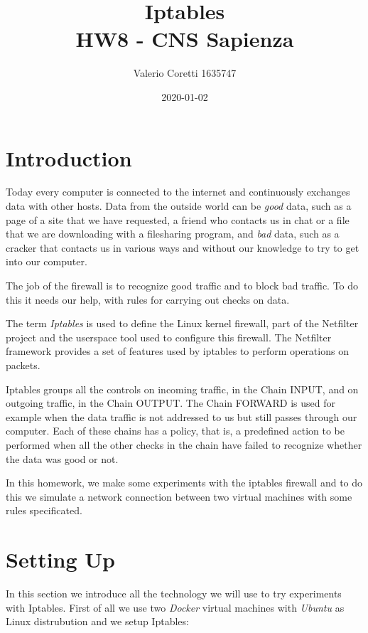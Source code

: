 \documentclass[11pt]{article}
\title{{\bf Iptables} \\ \bigskip \large HW8 - CNS Sapienza}
\date{2020-01-02}
\author{Valerio Coretti 1635747}
\begin{document}
\maketitle

\section{Introduction}
Today every computer is connected to the internet and continuously exchanges data with other hosts. Data from the outside world can be {\em good} data, such as a page of a site that we have requested, a friend who contacts us in chat or a file that we are downloading with a filesharing program, and {\em bad} data, such as a cracker that contacts us in various ways and without our knowledge to try to get into our computer.

The job of the firewall is to recognize good traffic and to block bad traffic. To do this it needs our help, with rules for carrying out checks on data.

The term {\em Iptables} is used to define the Linux kernel firewall, part of the Netfilter project and the userspace tool used to configure this firewall. The Netfilter framework provides a set of features used by iptables to perform operations on packets.

Iptables groups all the controls on incoming traffic, in the Chain INPUT, and on outgoing traffic, in the Chain OUTPUT. The Chain FORWARD is used for example when the data traffic is not addressed to us but still passes through our computer. Each of these chains has a policy, that is, a predefined action to be performed when all the other checks in the chain have failed to recognize whether the data was good or not.

In this homework, we make some experiments with the iptables firewall and to do this we simulate a network connection between two virtual machines with some rules specificated.

\section{Setting Up}
In this section we introduce all the technology we will use to try experiments with Iptables. First of all we use two {\em Docker} virtual machines with {\em Ubuntu} as Linux distrubution and we setup Iptables:
\end{document}
